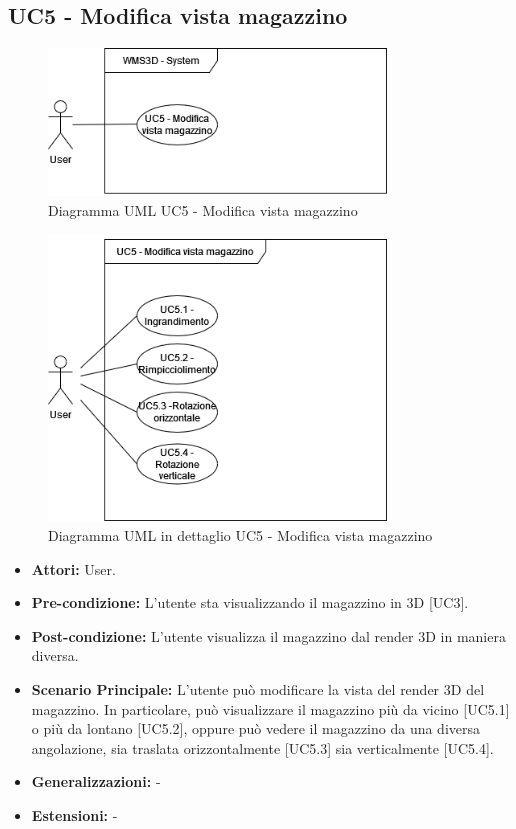 \subsection{UC5 - Modifica vista magazzino}
\begin{figure}[H]
  \centering
  \includegraphics[width=0.8\textwidth]{UC_diagrams_1-10/UC5_sys.drawio.png}
   \caption{Diagramma UML UC5 - Modifica vista magazzino}
\end{figure}
\begin{figure}[H]
  \centering
  \includegraphics[width=0.8\textwidth]{UC_diagrams_1-10/UC5.drawio.png}
   \caption{Diagramma UML in dettaglio UC5 - Modifica vista magazzino}
\end{figure}
\begin{itemize}
    \item \textbf{Attori:} User.
    \item \textbf{Pre-condizione:}  L'utente sta visualizzando il magazzino in 3D [UC3].
    \item \textbf{Post-condizione:} L'utente visualizza il magazzino dal render 3D in maniera diversa.
    \item \textbf{Scenario Principale:}  L'utente può modificare la vista del render 3D del magazzino. In particolare, può visualizzare il magazzino più da vicino [UC5.1] o più da lontano [UC5.2], oppure può vedere il magazzino da una diversa angolazione, sia traslata orizzontalmente [UC5.3] sia verticalmente [UC5.4].
    \item \textbf{Generalizzazioni:} -
    \item \textbf{Estensioni:} -
\end{itemize}


